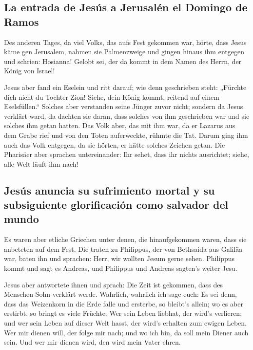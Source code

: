 \hypertarget{la-entrada-de-jesuxfas-a-jerusaluxe9n-el-domingo-de-ramos}{%
\subsection{La entrada de Jesús a Jerusalén el Domingo de
Ramos}\label{la-entrada-de-jesuxfas-a-jerusaluxe9n-el-domingo-de-ramos}}

 Des anderen Tages, da viel Volks, das aufs Fest gekommen
war, hörte, dass Jesus käme gen Jerusalem,  nahmen sie
Palmenzweige und gingen hinaus ihm entgegen und schrien: Hosianna!
Gelobt sei, der da kommt in dem Namen des Herrn, der König von Israel!

 Jesus aber fand ein Eselein und ritt darauf; wie denn
geschrieben steht:  „Fürchte dich nicht du Tochter Zion!
Siehe, dein König kommt, reitend auf einem Eselsfüllen.``
 Solches aber verstanden seine Jünger zuvor nicht;
sondern da Jesus verklärt ward, da dachten sie daran, dass solches von
ihm geschrieben war und sie solches ihm getan hatten. 
Das Volk aber, das mit ihm war, da er Lazarus aus dem Grabe rief und von
den Toten auferweckte, rühmte die Tat.  Darum ging ihm
auch das Volk entgegen, da sie hörten, er hätte solches Zeichen getan.
 Die Pharisäer aber sprachen untereinander: Ihr sehet,
dass ihr nichts ausrichtet; siehe, alle Welt läuft ihm nach!

\hypertarget{jesuxfas-anuncia-su-sufrimiento-mortal-y-su-subsiguiente-glorificaciuxf3n-como-salvador-del-mundo}{%
\subsection{Jesús anuncia su sufrimiento mortal y su subsiguiente
glorificación como salvador del
mundo}\label{jesuxfas-anuncia-su-sufrimiento-mortal-y-su-subsiguiente-glorificaciuxf3n-como-salvador-del-mundo}}

 Es waren aber etliche Griechen unter denen, die
hinaufgekommen waren, dass sie anbeteten auf dem Fest. 
Die traten zu Philippus, der von Bethsaida aus Galiläa war, baten ihn
und sprachen: Herr, wir wollten Jesum gerne sehen. 
Philippus kommt und sagt es Andreas, und Philippus und Andreas sagten's
weiter Jesu.

 Jesus aber antwortete ihnen und sprach: Die Zeit ist
gekommen, dass des Menschen Sohn verklärt werde. 
Wahrlich, wahrlich ich sage euch: Es sei denn, dass das Weizenkorn in
die Erde falle und ersterbe, so bleibt's allein; wo es aber erstirbt, so
bringt es viele Früchte.  Wer sein Leben liebhat, der
wird's verlieren; und wer sein Leben auf dieser Welt hasst, der wird's
erhalten zum ewigen Leben.  Wer mir dienen will, der
folge mir nach; und wo ich bin, da soll mein Diener auch sein. Und wer
mir dienen wird, den wird mein Vater ehren.

